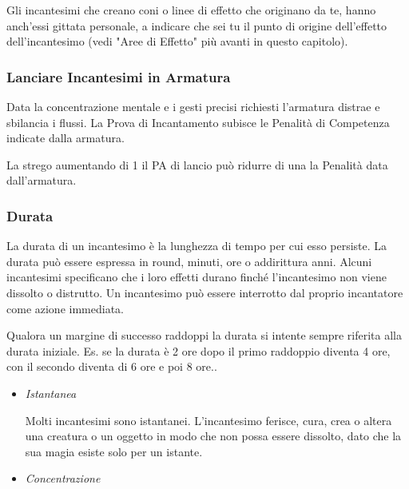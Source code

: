 \documentclass[12pt,a4paper,twoside,openany]{book}
\begin{document}
\begin{multicols}{2}
Gli incantesimi che creano coni o linee di effetto che originano da te, hanno anch'essi gittata personale, a indicare che sei tu il punto di origine dell'effetto dell'incantesimo (vedi "Aree di Effetto" più avanti in questo capitolo).

\subsubsection{Lanciare Incantesimi in Armatura}\label{magielanciareincantesimiinarmatura}

Data la concentrazione mentale e i gesti precisi richiesti l'armatura distrae e sbilancia i flussi. La Prova di Incantamento subisce le Penalità di Competenza indicate dalla armatura.

La strego aumentando di 1 il PA di lancio può ridurre di una la Penalità data dall'armatura.

\subsubsection{Durata}\label{magiedurata}

La durata di un incantesimo è la lunghezza di tempo per cui esso persiste. La durata può essere espressa in round, minuti, ore o addirittura anni. Alcuni incantesimi specificano che i loro effetti durano finché l'incantesimo non viene dissolto o distrutto. Un incantesimo può essere interrotto dal proprio incantatore come azione immediata.

Qualora un margine di successo raddoppi la durata si intente sempre riferita alla durata iniziale. Es. se la durata è 2 ore dopo il primo raddoppio diventa 4 ore, con il secondo diventa di 6 ore e poi 8 ore..

\begin{itemize}
	
\item
\textit{Istantanea}
	
Molti incantesimi sono istantanei. L'incantesimo ferisce, cura, crea o altera una creatura o un oggetto in modo che non possa essere dissolto, dato che la sua magia esiste solo per un istante.
	
\item
	
\textit{Concentrazione}
	

\end{itemize}
\end{multicols}
\end{document}
